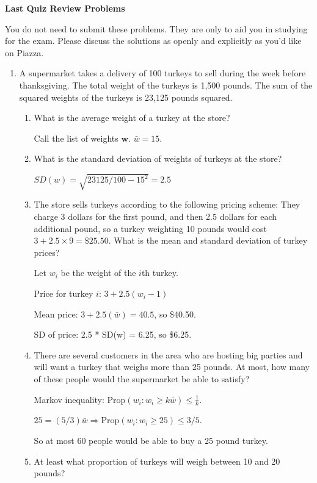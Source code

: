 \documentclass[11pt]{article}
\begin{document}
\centerline{\textbf{Last Quiz Review Problems}}
You do not need to submit these problems. They are only to aid you in studying for the exam. Please discuss the solutions as openly and explicitly as you'd like on Piazza.

\begin{enumerate}
\item A supermarket takes a delivery of 100 turkeys to sell during the week before thanksgiving.
The total weight of the turkeys is 1,500 pounds. The sum of the squared weights of the turkeys is 23,125 pounds squared.
\begin{enumerate}
    \item What is the average weight of a turkey at the store?

    {\color{red} Call the list of weights $\bm w$. $\bar w = 15$.}

    \item What is the standard deviation of weights of turkeys at the store?

    {\color{red} $SD(w) = \sqrt{23125/100 - 15^2} = 2.5$}

    \item The store sells turkeys according to the following pricing scheme: They charge 3 dollars for the first pound, and then 2.5 dollars for each additional pound, so
        a turkey weighting 10 pounds would cost $3 + 2.5 \times 9 = \$25.50$. What is the mean and standard deviation of turkey prices?

    {\color{red} Let $w_i$ be the weight of the $i$th turkey.

    Price for turkey $i$: $3 + 2.5(w_i-1)$

    Mean price: $3 + 2.5(\bar w) = 40.5$, so \$40.50.

    SD of price: 2.5 * SD(w) = 6.25, so \$6.25.}

    \item There are several customers in the area who are hosting big parties and will want a turkey that weighs more than 25 pounds.
        At most, how many of these people would the supermarket be able to satisfy?

    {\color{red} Markov inequality: $\mathrm{Prop}(w_i: w_i \geq k\bar{w}) \leq \frac{1}{k}$.

    $25 = (5/3)  \bar w \Rightarrow \mathrm{Prop}(w_i : w_i \geq 25) \leq 3/5$.

    So at most 60 people would be able to buy a 25 pound turkey.}
    
    \item At least what proportion of turkeys will weigh between 10 and 20 pounds?


\end{enumerate}
\end{enumerate}
\end{document}
